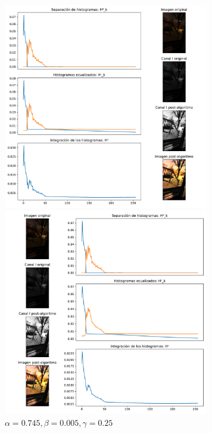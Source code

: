 \begin{figure}[H]
\begin{minipage}[c]{0.48\linewidth}
  \includegraphics[height=9cm]{imgs/porch-995-005-0.pdf}
  \caption{$\alpha = 0.995, \beta = 0.005, \gamma = 0$}
\end{minipage}
\hfill
\begin{minipage}[c]{0.48\linewidth}
  \includegraphics[height=9cm]{imgs/porch-745-005-25.pdf}
  \caption{$\alpha = 0.745, \beta = 0.005, \gamma = 0.25$}
\end{minipage}%
\end{figure}

